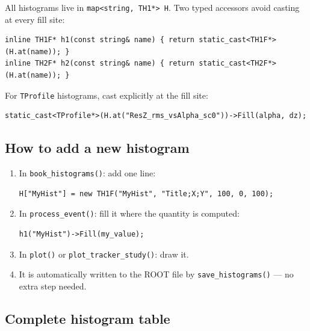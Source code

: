 \documentclass[11pt]{article}
\begin{document}
All histograms live in \texttt{map<string, TH1*> H}. Two typed accessors
avoid casting at every fill site:
\begin{lstlisting}
inline TH1F* h1(const string& name) { return static_cast<TH1F*>(H.at(name)); }
inline TH2F* h2(const string& name) { return static_cast<TH2F*>(H.at(name)); }
\end{lstlisting}

For \texttt{TProfile} histograms, cast explicitly at the fill site:
\begin{lstlisting}
static_cast<TProfile*>(H.at("ResZ_rms_vsAlpha_sc0"))->Fill(alpha, dz);
\end{lstlisting}

\subsection{How to add a new histogram}
\label{sec:add_histogram}

\begin{enumerate}
  \item In \texttt{book\_histograms()}: add one line:
\begin{lstlisting}
H["MyHist"] = new TH1F("MyHist", "Title;X;Y", 100, 0, 100);
\end{lstlisting}
  \item In \texttt{process\_event()}: fill it where the quantity is computed:
\begin{lstlisting}
h1("MyHist")->Fill(my_value);
\end{lstlisting}
  \item In \texttt{plot()} or \texttt{plot\_tracker\_study()}: draw it.
  \item It is automatically written to the ROOT file by
        \texttt{save\_histograms()} --- no extra step needed.
\end{enumerate}

\subsection{Complete histogram table}
\end{document}
